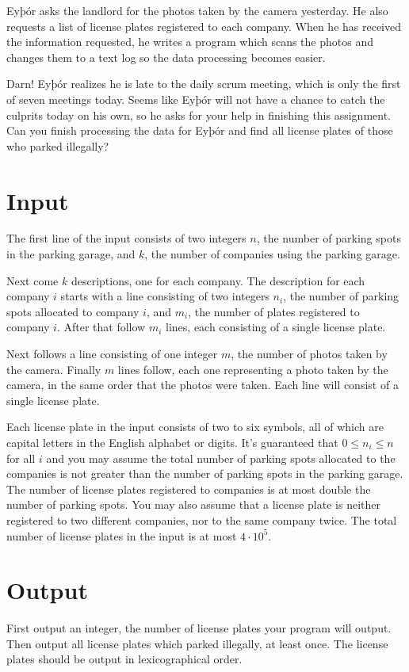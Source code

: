 Eyþór asks the landlord for the photos taken by the camera yesterday.
He also requests a list of license plates registered to each company.
When he has received the information requested, he writes a program which scans
the photos and changes them to a text log so the data processing becomes easier.

Darn! Eyþór realizes he is late to the daily scrum meeting, which is only the first of seven meetings today.
Seems like Eyþór will not have a chance to catch the culprits today on his own, so he asks for your help in finishing this assignment.
Can you finish processing the data for Eyþór and find all license plates of those who parked illegally?

\section*{Input}
The first line of the input consists of two integers $n$, the number of parking spots in the parking garage, and $k$, the number of companies using the parking garage.

Next come $k$ descriptions, one for each company.
The description for each company $i$ starts with a line consisting of two integers $n_i$, the number of parking spots allocated to company $i$, and $m_i$, the number of plates registered to company $i$.
After that follow $m_i$ lines, each consisting of a single license plate.

Next follows a line consisting of one integer $m$, the number of photos taken by the camera.
Finally $m$ lines follow, each one representing a photo taken by the camera, in the same order that the photos were taken.
Each line will consist of a single license plate.

Each license plate in the input consists of two to six symbols, all of which are capital letters in the English alphabet or digits.
It's guaranteed that $0 \leq n_i \leq n$ for all $i$ and you may assume the total number of parking spots allocated to the companies is not greater than the number of parking spots in the parking garage.
The number of license plates registered to companies is at most double the number of parking spots.
You may also assume that a license plate is neither registered to two different companies, nor to the same company twice.
The total number of license plates in the input is at most $4 \cdot 10^5$.

\section*{Output}
First output an integer, the number of license plates your program will output.
Then output all license plates which parked illegally, at least once.
The license plates should be output in lexicographical order.

